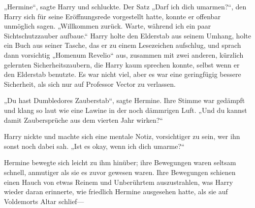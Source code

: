 „Hermine“, sagte Harry und schluckte. Der Satz „Darf ich dich umarmen?“, den Harry sich für seine Eröffnungsrede vorgestellt hatte, konnte er offenbar unmöglich sagen. „Willkommen zurück. Warte, während ich ein paar Sichtschutzzauber aufbaue.“
Harry holte den Elderstab aus seinem Umhang, holte ein Buch aus seiner Tasche, das er zu einem Lesezeichen aufschlug, und sprach dann vorsichtig „Homenum Revelio“ aus, zusammen mit zwei anderen, kürzlich gelernten Sicherheitszaubern, die Harry kaum sprechen konnte, selbst wenn er den Elderstab benutzte. Es war nicht viel, aber es war eine geringfügig bessere Sicherheit, als sich nur auf Professor Vector zu verlassen.

„Du hast Dumbledores Zauberstab“, sagte Hermine. Ihre Stimme war gedämpft und klang so laut wie eine Lawine in der noch dämmrigen Luft. „Und du kannst damit Zaubersprüche aus dem vierten Jahr wirken?“

Harry nickte und machte sich eine mentale Notiz, vorsichtiger zu sein, wer ihn sonst noch dabei sah.
„Ist es okay, wenn ich dich umarme?“

Hermine bewegte sich leicht zu ihm hinüber; ihre Bewegungen waren seltsam schnell, anmutiger als sie es zuvor gewesen waren. Ihre Bewegungen schienen einen Hauch von etwas Reinem und Unberührtem auszustrahlen, was Harry wieder daran erinnerte, wie friedlich Hermine ausgesehen hatte, als sie auf Voldemorts Altar schlief—

